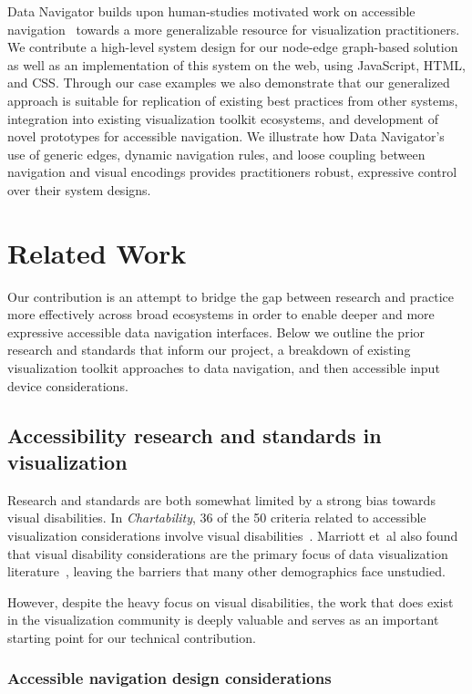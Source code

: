 \documentclass[12pt]{cmuthesis}
\newcommand{\ea}{{et~al\xperiod}\xspace}
\begin{document}
Data Navigator builds upon human-studies motivated work on accessible navigation~\cite{Zong2022Rich,Thompson2023Chart} towards a more generalizable resource for visualization practitioners. We contribute a high-level system design for our node-edge graph-based solution as well as an implementation of this system on the web, using JavaScript, HTML, and CSS. Through our case examples we also demonstrate that our generalized approach is suitable for replication of existing best practices from other systems, integration into existing visualization toolkit ecosystems, and development of novel prototypes for accessible navigation. We illustrate how Data Navigator's use of generic edges, dynamic navigation rules, and loose coupling between navigation and visual encodings provides practitioners robust, expressive control over their system designs.

\section{Related Work}
Our contribution is an attempt to bridge the gap between research and practice more effectively across broad ecosystems in order to enable deeper and more expressive accessible data navigation interfaces. Below we outline the prior research and standards that inform our project, a breakdown of existing visualization toolkit approaches to data navigation, and then accessible input device considerations.

\subsection{Accessibility research and standards in visualization}
Research and standards are both somewhat limited by a strong bias towards visual disabilities. In \textit{Chartability}, 36 of the 50 criteria related to accessible visualization considerations involve visual disabilities~\cite{Elavsky2022Chartability, Fan2023Accessibility}. Marriott \ea also found that visual disability considerations are the primary focus of data visualization literature~\cite{Marriott}, leaving the barriers that many other demographics face unstudied.

However, despite the heavy focus on visual disabilities, the work that does exist in the visualization community is deeply valuable and serves as an important starting point for our technical contribution.

\subsubsection{Accessible navigation design considerations}
\end{document}

